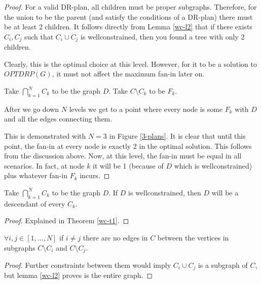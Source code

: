 \documentclass[11pt]{article}
\begin{document}
\begin{proof}
For a valid DR-plan, all children must be proper subgraphs. Therefore, for the union to be the parent (and satisfy the conditions of a DR-plan) there must be at least 2 children. It follows directly from Lemma \ref{wc-l2} that if there exists $C_i, C_j$ such that $C_i \cup C_j$ is wellconstrained, then you found a tree with only 2 children.

Clearly, this is the optimal choice at this level. However, for it to be a solution to $OPTDRP(G)$, it must not affect the maximum fan-in later on.

Take $\bigcap_{k=1}^N{C_k}$ to be the graph $D$. Take $C\setminus C_k$ to be $F_k$.

After we go down $N$ levels we get to a point where every node is some $F_k$ with $D$ and all the edges connecting them.

This is demonstrated with $N=3$ in Figure \ref{3-plans}. It is clear that until this point, the fan-in at every node is exactly 2 in the optimal solution. This follows from the discussion above. Now, at this level, the fan-in must be equal in all scenarios. In fact, at node $k$ it will be 1 (because of $D$ which is wellconstrained) plus whatever fan-in $F_k$ incurs.
\end{proof}




\begin{corollary}
Take $\bigcap_{k=1}^N{C_k}$ to be the graph $D$. If $D$ is wellconstrained, then $D$ will be a descendant of every $C_k$.
\end{corollary}

\begin{proof}
Explained in Theorem \ref{wc-t1}.
\end{proof}

\begin{corollary}
$\forall i,j\in [1,\ldots,N]$ if $i\neq j$ there are no edges in $C$ between the vertices in subgraphs $C\setminus C_i$ and $C\setminus C_j$.
\end{corollary}

\begin{proof}
Further constraints between them would imply $C_i \cup C_j$ is a subgraph of $C$, but lemma \ref{wc-l2} proves is the entire graph.
\end{proof}
\end{document}
